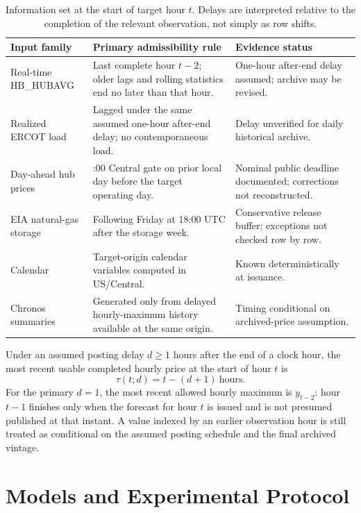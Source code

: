\documentclass[11pt,letterpaper]{article}
\begin{document}
\begin{table}[t]
\centering\small
\caption{Information set at the start of target hour $t$. Delays are interpreted relative to the completion of the relevant observation, not simply as row shifts.}\label{tab:availability}
\begin{tabularx}{\linewidth}{@{}>{\raggedright\arraybackslash}p{2.45cm}>{\raggedright\arraybackslash}X>{\raggedright\arraybackslash}p{2.45cm}@{}}
\toprule
Input family & Primary admissibility rule & Evidence status \\
\midrule
Real-time HB\_HUBAVG & Last complete hour $t-2$; older lags and rolling statistics end no later than that hour. & One-hour after-end delay assumed; archive may be revised. \\
Realized ERCOT load & Lagged under the same assumed one-hour after-end delay; no contemporaneous load. & Delay unverified for daily historical archive. \\
Day-ahead hub prices & 14:00 Central gate on prior local day before the target operating day. & Nominal public deadline documented; corrections not reconstructed. \\
EIA natural-gas storage & Following Friday at 18:00 UTC after the storage week. & Conservative release buffer; exceptions not checked row by row. \\
Calendar & Target-origin calendar variables computed in US/Central. & Known deterministically at issuance. \\
Chronos summaries & Generated only from delayed hourly-maximum history available at the same origin. & Timing conditional on archived-price assumption. \\
\bottomrule
\end{tabularx}
\end{table}

Under an assumed posting delay $d\geq1$ hours after the end of a clock hour, the most recent usable completed hourly price at the start of hour $t$ is
\begin{equation}\label{eq:cutoff}
  \tau(t;d)=t-(d+1)\ \text{hours}.
\end{equation}
For the primary $d=1$, the most recent allowed hourly maximum is $y_{t-2}$: hour $t-1$ finishes only when the forecast for hour $t$ is issued and is not presumed published at that instant. A value indexed by an earlier observation hour is still treated as conditional on the assumed posting schedule and the final archived vintage.

\section{Models and Experimental Protocol}\label{sec:methods}
\end{document}
